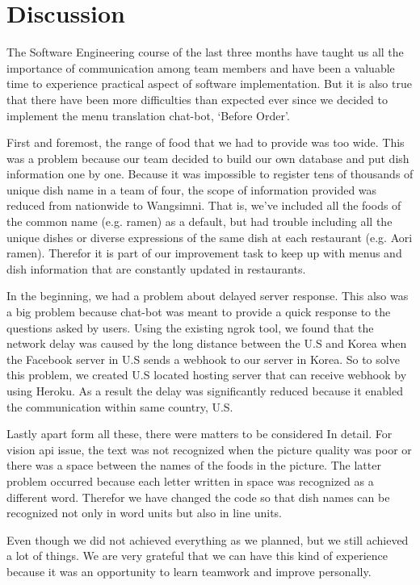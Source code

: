 \section{Discussion}

The Software Engineering course of the last three months have taught us all the importance of communication among team members and have been a valuable time to experience practical aspect of software implementation. But it is also true that there have been more difficulties than expected ever since we decided to implement the menu translation chat-bot, ‘Before Order’.

 First and foremost, the range of food that we had to provide was too wide. This was a problem because our team decided to build our own database and put dish information one by one. Because it was impossible to register tens of thousands of unique dish name in a team of four, the scope of information provided was reduced from nationwide to Wangsimni. That is, we’ve included all the foods of the common name (e.g. ramen) as a default, but had trouble including all the unique dishes or diverse expressions of the same dish at each restaurant (e.g. Aori ramen). Therefor it is part of our improvement task to keep up with menus and dish information that are constantly updated in restaurants. 

 In the beginning, we had a problem about delayed server response. This also was a big problem because chat-bot was meant to provide a quick response to the questions asked by users. Using the existing ngrok tool, we found that the network delay was caused by the long distance between the U.S and Korea when the Facebook server in U.S sends a webhook to our server in Korea. So to solve this problem, we created U.S located hosting server that can receive webhook by using Heroku. As a result the delay was significantly reduced because it enabled the communication within same country, U.S.

 Lastly apart form all these, there were matters to be considered In detail. For vision api issue, the text was not recognized when the picture quality was poor or there was a space between the names of the foods in the picture. The latter problem occurred because each letter written in space was recognized as a different word. Therefor we have changed the code so that dish names can be recognized not only in word units but also in line units.

 Even though we did not achieved everything as we planned, but we still achieved a lot of things. We are very grateful that we can have this kind of experience because it was an opportunity to learn teamwork and improve personally. 
